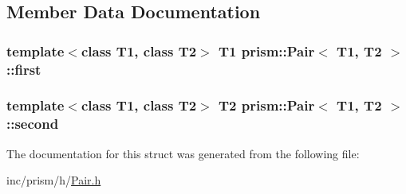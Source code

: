 \subsection{Member Data Documentation}
\subsubsection[{\texorpdfstring{first}{first}}]{\setlength{\rightskip}{0pt plus 5cm}template$<$class T1, class T2$>$ T1 {\bf prism\+::\+Pair}$<$ T1, T2 $>$\+::first}\hypertarget{structprism_1_1_pair_a5284359e4f965f152726c7d3ff95021a}{}\label{structprism_1_1_pair_a5284359e4f965f152726c7d3ff95021a}
\subsubsection[{\texorpdfstring{second}{second}}]{\setlength{\rightskip}{0pt plus 5cm}template$<$class T1, class T2$>$ T2 {\bf prism\+::\+Pair}$<$ T1, T2 $>$\+::second}\hypertarget{structprism_1_1_pair_aca5dc71f12a19dbe1591f4b7e867396a}{}\label{structprism_1_1_pair_aca5dc71f12a19dbe1591f4b7e867396a}


The documentation for this struct was generated from the following file\+:\begin{DoxyCompactItemize}
\item 
inc/prism/h/\hyperlink{_pair_8h}{Pair.\+h}\end{DoxyCompactItemize}
